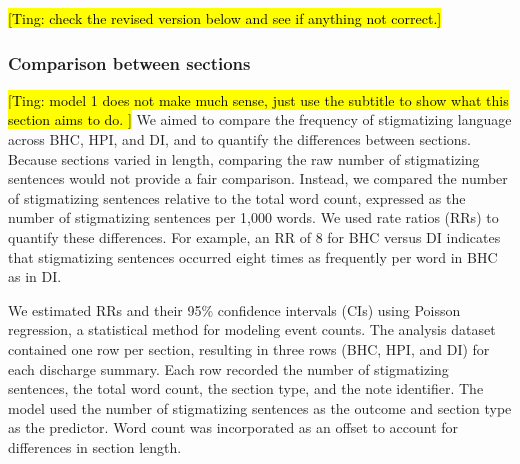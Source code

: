 \documentclass[unnumsec,webpdf,contemporary,large]{oup-authoring-template}
\newcommand{\td}[1]{\sethlcolor{pink}\hl{[Ting: #1]}}
\begin{document}

\td{check the revised version below and see if anything not correct.}
\subsubsection{Comparison between sections}
\td{model 1 does not make much sense, just use the subtitle to show what this section aims to do. }
We aimed to compare the frequency of stigmatizing language across BHC, HPI, and DI, and to quantify the differences between sections. Because sections varied in length, comparing the raw number of stigmatizing sentences would not provide a fair comparison. Instead, we compared the number of stigmatizing sentences relative to the total word count, expressed as the number of stigmatizing sentences per 1,000 words. We used rate ratios (RRs) to quantify these differences. For example, an RR of 8 for BHC versus DI indicates that stigmatizing sentences occurred eight times as frequently per word in BHC as in DI.

We estimated RRs and their 95\% confidence intervals (CIs) using Poisson regression,\cite{mccullagh1989} a statistical method for modeling event counts. The analysis dataset contained one row per section, resulting in three rows (BHC, HPI, and DI) for each discharge summary. Each row recorded the number of stigmatizing sentences, the total word count, the section type, and the note identifier. The model used the number of stigmatizing sentences as the outcome and section type as the predictor. Word count was incorporated as an offset to account for differences in section length.
\end{document}
